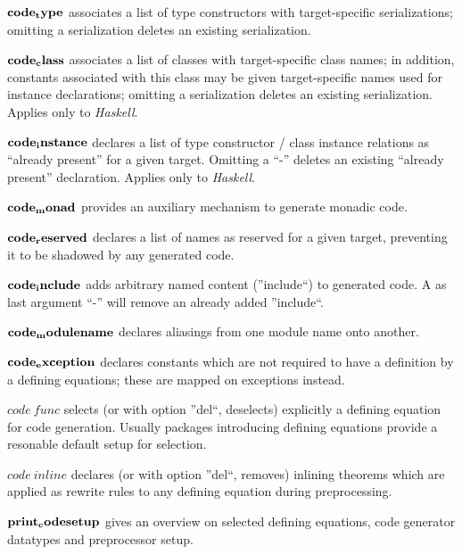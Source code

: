 \begin{descr}
\item [${\mathord{\mathbf{code_type}}}$] associates a list of type constructors
  with target-specific serializations; omitting a serialization
  deletes an existing serialization.

\item [${\mathord{\mathbf{code_class}}}$] associates a list of classes
  with target-specific class names; in addition, constants associated
  with this class may be given target-specific names used for instance
  declarations; omitting a serialization
  deletes an existing serialization.  Applies only to \emph{Haskell}.

\item [${\mathord{\mathbf{code_instance}}}$] declares a list of type constructor / class
  instance relations as ``already present'' for a given target.
  Omitting a ``-'' deletes an existing ``already present'' declaration.
  Applies only to \emph{Haskell}.

\item [${\mathord{\mathbf{code_monad}}}$] provides an auxiliary mechanism
  to generate monadic code.

\item [${\mathord{\mathbf{code_reserved}}}$] declares a list of names
  as reserved for a given target, preventing it to be shadowed
  by any generated code.

\item [${\mathord{\mathbf{code_include}}}$] adds arbitrary named content (''include``)
  to generated code. A as last argument ``-'' will remove an already added ''include``.

\item [${\mathord{\mathbf{code_modulename}}}$] declares aliasings from one module name
  onto another.

\item [${\mathord{\mathbf{code_exception}}}$] declares constants which are not required
  to have a definition by a defining equations; these are mapped on exceptions
  instead.

\item [$code\ func$] selects (or with option ''del``, deselects) explicitly
  a defining equation for code generation.  Usually packages introducing
  defining equations provide a resonable default setup for selection.

\item [$code\ inline$] declares (or with option ''del``, removes)
  inlining theorems which are applied as rewrite rules to any defining equation
  during preprocessing.

\item [${\mathord{\mathbf{print_codesetup}}}$] gives an overview on selected
  defining equations, code generator datatypes and preprocessor setup.

\end{descr}

